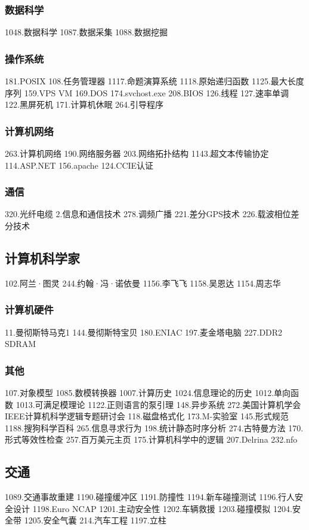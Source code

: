 \subsubsection{数据科学}
1048.数据科学
1087.数据采集
1088.数据挖掘
\subsubsection{操作系统}
181.POSIX
108.任务管理器
1117.命题演算系统
1118.原始递归函数
1125.最大长度序列
159.VPS VM
169.DOS
174.svchost.exe
208.BIOS
126.线程
127.速率单调
122.黑屏死机
171.计算机休眠
264.引导程序
\subsubsection{计算机网络}
263.计算机网络
190.网络服务器
203.网络拓扑结构
1143.超文本传输协定
114.ASP.NET
156.apache
124.CCIE认证
\subsubsection{通信}
320.光纤电缆
2.信息和通信技术
278.调频广播
221.差分GPS技术
226.载波相位差分技术
\subsection{计算机科学家}
102.阿兰·图灵
244.约翰·冯·诺依曼
1156.李飞飞
1158.吴恩达
1154.周志华
\subsubsection{计算机硬件}
11.曼彻斯特马克1
144.曼彻斯特宝贝
180.ENIAC 197.麦金塔电脑
227.DDR2 SDRAM
\subsubsection{其他}
107.对象模型
1085.数模转换器
1007.计算历史
1024.信息理论的历史
1012.单向函数
1013.可满足模理论
1122.正则语言的泵引理
148.异步系统
272.美国计算机学会IEEE计算机科学逻辑专题研讨会
118.磁盘格式化
173.M-实验室
145.形式规范
1188.搜狗科学百科
265.信息寻求行为
198.统计静态时序分析
274.古特曼方法
170.形式等效性检查
257.百万美元主页
175.计算机科学中的逻辑
207.Delrina
232.nfo

\subsection{交通}
1089.交通事故重建
1190.碰撞缓冲区
1191.防撞性
1194.新车碰撞测试
1196.行人安全设计
1198.Euro NCAP
1201.主动安全性
1202.车辆救援
1203.碰撞模拟
1204.安全带
1205.安全气囊
214.汽车工程
1197.立柱

